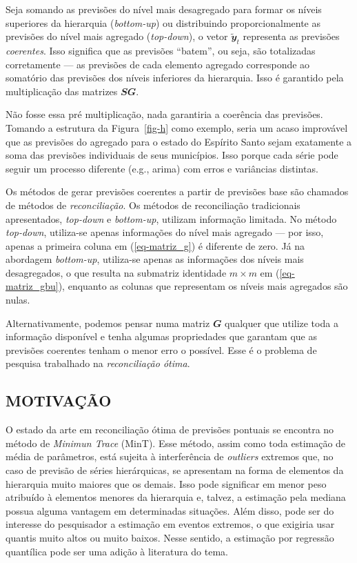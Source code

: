 \documentclass[
  12pt,
  oneside,
  a4paper,
  chapter=TITLE,
  section=TITLE,
  subsubsection=TITLE,
  brazil]{abntex2}
\begin{document}
  Seja somando as previsões do
nível mais desagregado para formar os níveis superiores da hierarquia
(\emph{bottom-up}) ou distribuindo proporcionalmente as previsões do
nível mais agregado (\emph{top-down}), o vetor
\(\mathbfit{\tilde{y}}_t\) representa as previsões \emph{coerentes}.
Isso significa que as previsões ``batem'', ou seja, são totalizadas
corretamente --- as previsões de cada elemento agregado corresponde ao
somatório das previsões dos níveis inferiores da hierarquia. Isso é
garantido pela multiplicação das matrizes \(\mathbfit{SG}\).

Não fosse essa pré multiplicação, nada garantiria a coerência das
previsões. Tomando a estrutura da Figura~\ref{fig-h} como exemplo, seria
um acaso improvável que as previsões do agregado para o estado do
Espírito Santo sejam exatamente a soma das previsões individuais de seus
municípios. Isso porque cada série pode seguir um processo diferente
(e.g., arima) com erros e variâncias distintas.

Os métodos de gerar previsões coerentes a partir de previsões base são
chamados de métodos de \emph{reconciliação}. Os métodos de reconciliação
tradicionais apresentados, \emph{top-down} e \emph{bottom-up}, utilizam
informação limitada. No método \emph{top-down}, utiliza-se apenas
informações do nível mais agregado --- por isso, apenas a primeira
coluna em (\ref{eq-matriz_g}) é diferente de zero. Já na abordagem
\emph{bottom-up}, utiliza-se apenas as informações dos níveis mais
desagregados, o que resulta na submatriz identidade \(m \times m\) em
(\ref{eq-matriz_gbu}), enquanto as colunas que representam os níveis
mais agregados são nulas.

Alternativamente, podemos pensar numa matriz \(\mathbfit{G}\) qualquer
que utilize toda a informação disponível e tenha algumas propriedades
que garantam que as previsões coerentes tenham o menor erro o possível.
Esse é o problema de pesquisa trabalhado na \emph{reconciliação ótima}.

\hypertarget{motivauxe7uxe3o}{%
\subsection{MOTIVAÇÃO}\label{motivauxe7uxe3o}}

O estado da arte em reconciliação ótima de previsões pontuais se
encontra no método de \emph{Minimun Trace} (MinT). Esse método, assim
como toda estimação de média de parâmetros, está sujeita à interferência
de \emph{outliers} extremos que, no caso de previsão de séries
hierárquicas, se apresentam na forma de elementos da hierarquia muito
maiores que os demais. Isso pode significar em menor peso atribuído à
elementos menores da hierarquia e, talvez, a estimação pela mediana
possua alguma vantagem em determinadas situações. Além disso, pode ser
do interesse do pesquisador a estimação em eventos extremos, o que
exigiria usar quantis muito altos ou muito baixos. Nesse sentido, a
estimação por regressão quantílica pode ser uma adição à literatura do
tema.
\end{document}
